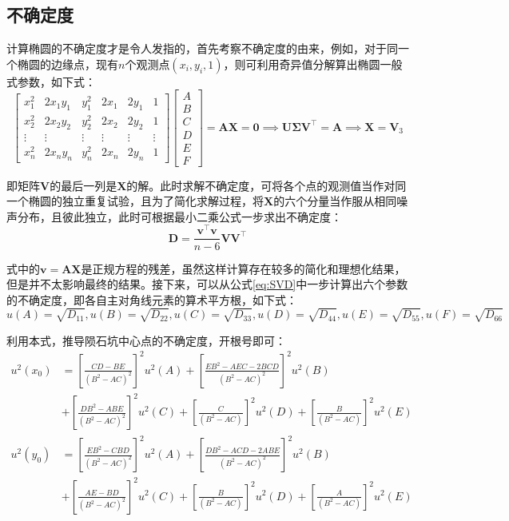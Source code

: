 \documentclass{article}
\begin{document}
\subsection{不确定度}
计算椭圆的不确定度才是令人发指的，首先考察不确定度的由来，例如，对于同一个椭圆的边缘点，现有$n$个观测点$(x_i,y_i,1)$，则可利用奇异值分解算出椭圆一般式参数，如下式：
\begin{equation*}
  \begin{bmatrix}
    x_1^2&2x_1y_1&y^2_1&2x_1&2y_1&1\\
    x_2^2&2x_2y_2&y^2_2&2x_2&2y_2&1\\
    \vdots&\vdots&\vdots&\vdots&\vdots&\vdots\\
    x_n^2&2x_ny_n&y^2_n&2x_n&2y_n&1
\end{bmatrix}
  \begin{bmatrix}
    A\\B\\C\\D\\E\\F
  \end{bmatrix}=\mathbf{AX}=\mathbf{0}\implies\mathbf{U}\mathbold{\Sigma}\mathbf{ V}^\top=\mathbf{A}\implies\mathbf{X}=\mathbf{V}_3
\end{equation*}\par
即矩阵$\mathbf{V}$的最后一列是$\mathbf{X}$的解。此时求解不确定度，可将各个点的观测值当作对同一个椭圆的独立重复试验，且为了简化求解过程，将$\mathbf{X}$的六个分量当作服从相同噪声分布，且彼此独立，此时可根据最小二乘公式一步求出不确定度：
\begin{equation}
  \mathbf{D}=\frac{\mathbf{v^\top v}}{n-6}\mathbf{VV^\top}
  \label{eq:SVD}
\end{equation}\par
式中的$\mathbf{v=AX}$是正规方程的残差，虽然这样计算存在较多的简化和理想化结果，但是并不太影响最终的结果。接下来，可以从公式\ref{eq:SVD}中一步计算出六个参数的不确定度，即各自主对角线元素的算术平方根，如下式：
\begin{equation*}
  u(A)=\sqrt{D_{11}},u(B)=\sqrt{D_{22}},u(C)=\sqrt{D_{33}},u(D)=\sqrt{D_{44}},u(E)=\sqrt{D_{55}},u(F)=\sqrt{D_{66}}
\end{equation*}\par
利用本式，推导陨石坑中心点的不确定度，开根号即可：
\begin{equation}
  \begin{aligned}
    u^2(x_0)&=\left[\frac{CD-BE}{(B^2-AC)^2}\right]^2u^2(A)+\left[\frac{EB^2-AEC-2BCD}{(B^2-AC)^2}\right]^2u^2(B)\\
    &+\left[\frac{DB^2-ABE}{(B^2-AC)^2}\right]^2u^2(C)+\left[\frac{C}{(B^2-AC)}\right]^2u^2(D)+\left[\frac{B}{(B^2-AC)}\right]^2u^2(E)\\
    u^2(y_0)&=\left[\frac{EB^2-CBD}{(B^2-AC)^2}\right]^2u^2(A)+\left[\frac{DB^2-ACD-2ABE}{(B^2-AC)^2}\right]^2u^2(B)\\
    &+\left[\frac{AE-BD}{(B^2-AC)^2}\right]^2u^2(C)+\left[\frac{B}{(B^2-AC)}\right]^2u^2(D)+\left[\frac{A}{(B^2-AC)}\right]^2u^2(E)\\
  \end{aligned}
\end{equation}\par
\end{document}
